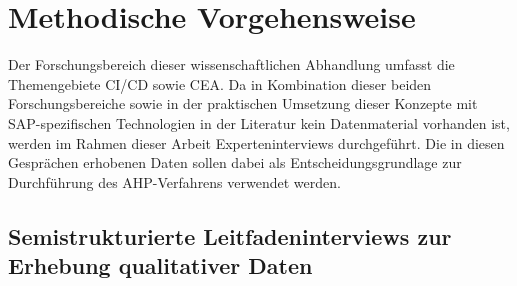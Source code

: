 \section{Methodische Vorgehensweise}

Der Forschungsbereich dieser wissenschaftlichen Abhandlung umfasst die Themengebiete CI/CD sowie CEA. Da in Kombination dieser beiden Forschungsbereiche sowie in der praktischen Umsetzung dieser Konzepte mit SAP-spezifischen Technologien in der Literatur kein Datenmaterial vorhanden ist, werden im Rahmen dieser Arbeit Experteninterviews durchgeführt. Die in diesen Gesprächen erhobenen Daten sollen dabei als Entscheidungsgrundlage zur Durchführung des AHP-Verfahrens verwendet werden.
\subsection{Semistrukturierte Leitfadeninterviews zur Erhebung qualitativer Daten}
